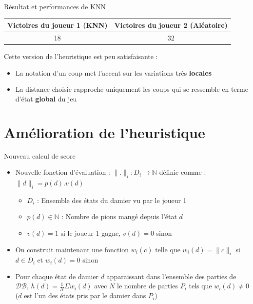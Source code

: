 \documentclass{beamer}
\begin{document}
\begin{frame}{Résultat et performances de KNN}
    \begin{center}
        \begin{tabular}{ | c | c | }
            \hline
            Victoires du joueur 1 (KNN) & Victoires du joueur 2 (Aléatoire) \\ \hline
            18                          & 32                                \\ \hline
        \end{tabular}
    \end{center}
    Cette version de l'heuristique est peu satisfaisante :
    \begin{itemize}
        \item La notation d'un coup met l'accent sur les variations très \textbf{locales}
        \item La distance choisie rapproche uniquement les coups qui se ressemble en terme d'état \textbf{global} du jeu
    \end{itemize}
\end{frame}

{\section{Amélioration de l'heuristique}}

\begin{frame}{Nouveau calcul de score}
    \begin{itemize}
        \item Nouvelle fonction d'évaluation : \newline
              $\lVert.\rVert_i : D_i \to \mathbb{N}$ définie comme : $\lVert d \rVert_i = p(d).v(d)$
              \begin{itemize}
                  \item $D_i$ : Ensemble des états du damier vu par le joueur 1
                  \item $p(d) \in \mathbb{N}$ : Nombre de pions mangé depuis l'état $d$
                  \item  $v(d) = 1$ si le joueur 1 gagne, $v(d) = 0$ sinon
              \end{itemize}
        \item On construit maintenant une fonction $w_i(c)$ telle que $w_i(d) = \lVert c \lVert_i$ si $d \in D_i$ et $w_i(d) = 0$ sinon
        \item Pour chaque état de damier $d$ apparaissant dans l'ensemble des parties de $\mathcal{DB}$, $h(d) = \frac{1}{N}\Sigma w_i(d)$ avec $N$ le nombre de parties $P_i$ tels que $w_i(d) \neq 0$ ($d$ est l'un des états pris par le damier dans $P_i$)
    \end{itemize}
\end{frame}
\end{document}
